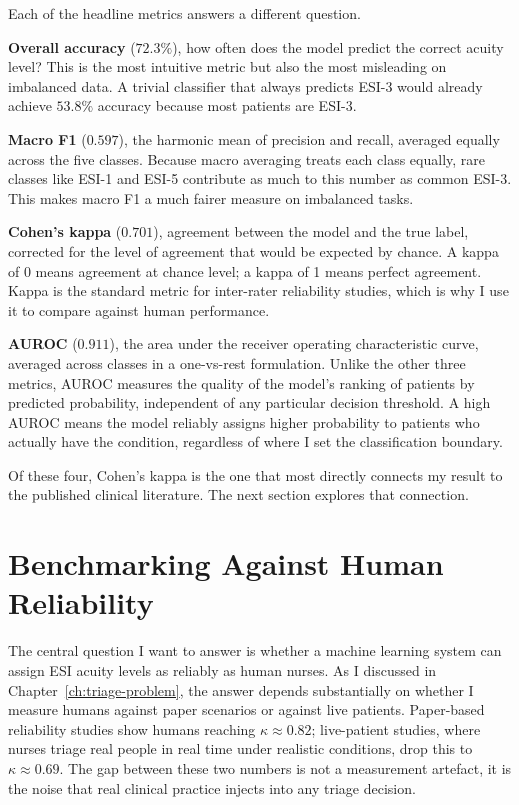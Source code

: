 \begin{notebox}
Each of the headline metrics answers a different question.

\textbf{Overall accuracy} ($72.3\%$), how often does the model predict the correct acuity level? This is the most intuitive metric but also the most misleading on imbalanced data. A trivial classifier that always predicts ESI-3 would already achieve $53.8\%$ accuracy because most patients are ESI-3.

\textbf{Macro F1} ($0.597$), the harmonic mean of precision and recall, averaged equally across the five classes. Because macro averaging treats each class equally, rare classes like ESI-1 and ESI-5 contribute as much to this number as common ESI-3. This makes macro F1 a much fairer measure on imbalanced tasks.

\textbf{Cohen's kappa} ($0.701$), agreement between the model and the true label, corrected for the level of agreement that would be expected by chance. A kappa of 0 means agreement at chance level; a kappa of 1 means perfect agreement. Kappa is the standard metric for inter-rater reliability studies, which is why I use it to compare against human performance.

\textbf{AUROC} ($0.911$), the area under the receiver operating characteristic curve, averaged across classes in a one-vs-rest formulation. Unlike the other three metrics, AUROC measures the quality of the model's ranking of patients by predicted probability, independent of any particular decision threshold. A high AUROC means the model reliably assigns higher probability to patients who actually have the condition, regardless of where I set the classification boundary.
\end{notebox}

Of these four, Cohen's kappa is the one that most directly connects my result to the published clinical literature. The next section explores that connection.

\section{Benchmarking Against Human Reliability}

The central question I want to answer is whether a machine learning system can assign ESI acuity levels as reliably as human nurses. As I discussed in Chapter~\ref{ch:triage-problem}, the answer depends substantially on whether I measure humans against paper scenarios or against live patients. Paper-based reliability studies show humans reaching $\kappa \approx 0.82$; live-patient studies, where nurses triage real people in real time under realistic conditions, drop this to $\kappa \approx 0.69$. The gap between these two numbers is not a measurement artefact, it is the noise that real clinical practice injects into any triage decision.

